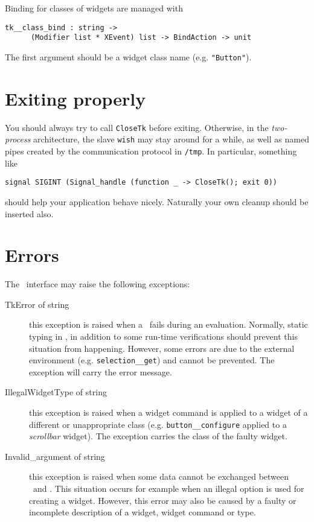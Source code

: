 Binding for classes of widgets are managed with
\begin{verbatim}
tk__class_bind : string -> 
      (Modifier list * XEvent) list -> BindAction -> unit
\end{verbatim} 
The first argument should be a widget class name (e.g. \verb|"Button"|).

\section{Exiting properly}
You should always try to call \verb|CloseTk| before exiting. Otherwise, in
the {\em two-process} architecture, the slave {\tt wish} may stay around for
a while, as well as named pipes created by the communication protocol in
\verb|/tmp|. In particular, something like  
\begin{verbatim}
signal SIGINT (Signal_handle (function _ -> CloseTk(); exit 0))
\end{verbatim} 
should help your application behave nicely. Naturally your own cleanup
should be inserted also.

\section{Errors}
The \camltk\ interface may raise the following exceptions:
\begin{description}
\item[TkError of string] this exception is raised when a \tcl\tk\ fails
during an evaluation. Normally, static typing in \caml, in addition to some
run-time verifications should prevent this situation from happening.
However, some errors are due to the external environment (e.g.
\verb|selection__get|) and cannot be prevented. The exception will carry the
\tcl\tk error message.

\item[IllegalWidgetType of string]
this exception is raised when a widget command is applied to a widget of a
different or unappropriate class (e.g. \verb|button__configure| applied to
a {\em scrollbar} widget). The exception carries the class of the faulty
widget.

\item[Invalid\_argument of string]
this exception is raised  when some data cannot be exchanged between \caml\
and \tk. This situation occurs for example when an illegal option is used
for creating a widget. However, this error may also be caused by a faulty or
incomplete description of a widget, widget command or type.
\end{description} 

